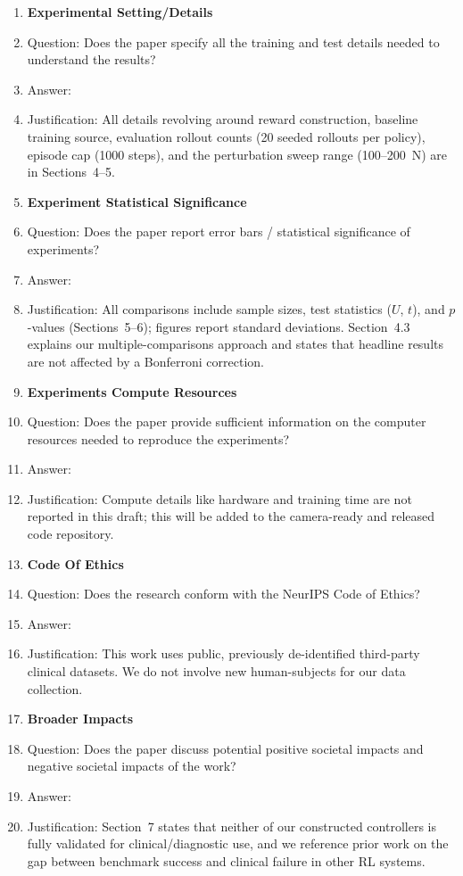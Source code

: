 \documentclass{article}
\begin{document}
\begin{enumerate}
\item {\bf Experimental Setting/Details}
    \item[] Question: Does the paper specify all the training and test details needed to understand the results?
    \item[] Answer: \answerYes{}
    \item[] Justification: All details revolving around reward construction, baseline training source, evaluation rollout counts (20 seeded rollouts per policy), episode cap (1000 steps), and the perturbation sweep range (100--200~N) are in Sections~4--5.

\item {\bf Experiment Statistical Significance}
    \item[] Question: Does the paper report error bars / statistical significance of experiments?
    \item[] Answer: \answerYes{}
    \item[] Justification: All comparisons include sample sizes, test statistics ($U$, $t$), and $p$-values (Sections~5--6); figures report standard deviations. Section~4.3 explains our multiple-comparisons approach and states that headline results are not affected by a Bonferroni correction.

\item {\bf Experiments Compute Resources}
    \item[] Question: Does the paper provide sufficient information on the computer resources needed to reproduce the experiments?
    \item[] Answer: \answerNo{}
    \item[] Justification: Compute details like hardware and training time are not reported in this draft; this will be added to the camera-ready and released code repository.

\item {\bf Code Of Ethics}
    \item[] Question: Does the research conform with the NeurIPS Code of Ethics?
    \item[] Answer: \answerYes{}
    \item[] Justification: This work uses public, previously de-identified third-party clinical datasets. We do not involve new human-subjects for our data collection.

\item {\bf Broader Impacts}
    \item[] Question: Does the paper discuss potential positive societal impacts and negative societal impacts of the work?
    \item[] Answer: \answerYes{}
    \item[] Justification: Section~7 states that neither of our constructed controllers is fully validated for clinical/diagnostic use, and we reference prior work on the gap between benchmark success and clinical failure in other RL systems.


\end{enumerate}
\end{document}
